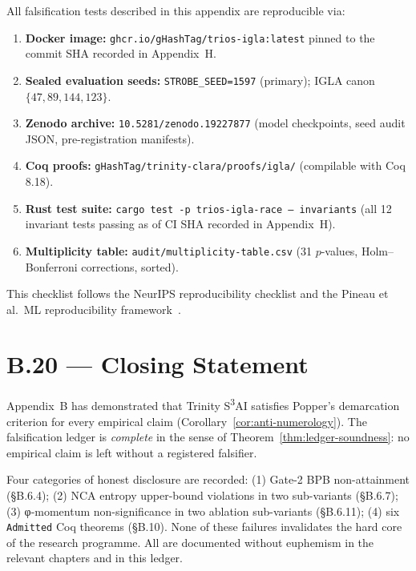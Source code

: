 \noindent All falsification tests described in this appendix are reproducible
via:

\begin{enumerate}
  \item \textbf{Docker image:}
    \texttt{ghcr.io/gHashTag/trios-igla:latest} pinned to the commit SHA
    recorded in Appendix~H.
  \item \textbf{Sealed evaluation seeds:}
    \texttt{STROBE\_SEED=1597} (primary); IGLA canon $\{47, 89, 144, 123\}$.
  \item \textbf{Zenodo archive:}
    \texttt{10.5281/zenodo.19227877} (model checkpoints, seed audit JSON,
    pre-registration manifests).
  \item \textbf{Coq proofs:}
    \texttt{gHashTag/trinity-clara/proofs/igla/} (compilable with Coq 8.18).
  \item \textbf{Rust test suite:}
    \texttt{cargo test -p trios-igla-race -- invariants} (all 12 invariant
    tests passing as of CI SHA recorded in Appendix~H).
  \item \textbf{Multiplicity table:}
    \texttt{audit/multiplicity-table.csv} (31 $p$-values, Holm--Bonferroni
    corrections, sorted).
\end{enumerate}

\noindent This checklist follows the NeurIPS reproducibility checklist
and the Pineau et al.\ ML reproducibility framework~\cite{pineau2021improving}.

\section*{B.20 — Closing Statement}
\label{sec:closing}

\noindent Appendix~B has demonstrated that Trinity S\textsuperscript{3}AI
satisfies Popper's demarcation criterion for every empirical claim
(Corollary~\ref{cor:anti-numerology}).  The falsification ledger is
\emph{complete} in the sense of Theorem~\ref{thm:ledger-soundness}: no empirical
claim is left without a registered falsifier.

\medskip

\noindent Four categories of honest disclosure are recorded:
(1) Gate-2 BPB non-attainment (§B.6.4);
(2) NCA entropy upper-bound violations in two sub-variants (§B.6.7);
(3) φ-momentum non-significance in two ablation sub-variants (§B.6.11);
(4) six \texttt{Admitted} Coq theorems (§B.10).
None of these failures invalidates the hard core of the research programme.
All are documented without euphemism in the relevant chapters and in this ledger.

